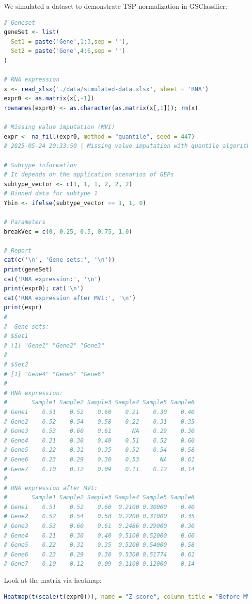 \documentclass[
  12pt,
]{book}
\begin{document}
We simulated a dataset to demonstrate TSP normalization in GSClassifier:

\begin{lstlisting}[language=R]
# Geneset
geneSet <- list(
  Set1 = paste('Gene',1:3,sep = ''),
  Set2 = paste('Gene',4:6,sep = '')
)

# RNA expression
x <- read_xlsx('./data/simulated-data.xlsx', sheet = 'RNA')
expr0 <- as.matrix(x[,-1])
rownames(expr0) <- as.character(as.matrix(x[,1])); rm(x)

# Missing value imputation (MVI)
expr <- na_fill(expr0, method = "quantile", seed = 447)
# 2025-05-24 20:33:50 | Missing value imputation with quantile algorithm!

# Subtype information
# It depends on the application scenarios of GEPs
subtype_vector <- c(1, 1, 1, 2, 2, 2)
# Binned data for subtype 1
Ybin <- ifelse(subtype_vector == 1, 1, 0)

# Parameters
breakVec = c(0, 0.25, 0.5, 0.75, 1.0)

# Report
cat(c('\n', 'Gene sets:', '\n'))
print(geneSet)
cat('RNA expression:', '\n')
print(expr0); cat('\n')
cat('RNA expression after MVI:', '\n')
print(expr)
# 
#  Gene sets: 
# $Set1
# [1] "Gene1" "Gene2" "Gene3"
# 
# $Set2
# [1] "Gene4" "Gene5" "Gene6"
# 
# RNA expression: 
#       Sample1 Sample2 Sample3 Sample4 Sample5 Sample6
# Gene1    0.51    0.52    0.60    0.21    0.30    0.40
# Gene2    0.52    0.54    0.58    0.22    0.31    0.35
# Gene3    0.53    0.60    0.61      NA    0.29    0.30
# Gene4    0.21    0.30    0.40    0.51    0.52    0.60
# Gene5    0.22    0.31    0.35    0.52    0.54    0.58
# Gene6    0.23    0.29    0.30    0.53      NA    0.61
# Gene7    0.10    0.12    0.09    0.11    0.12    0.14
# 
# RNA expression after MVI: 
#       Sample1 Sample2 Sample3 Sample4 Sample5 Sample6
# Gene1    0.51    0.52    0.60  0.2100 0.30000    0.40
# Gene2    0.52    0.54    0.58  0.2200 0.31000    0.35
# Gene3    0.53    0.60    0.61  0.2486 0.29000    0.30
# Gene4    0.21    0.30    0.40  0.5100 0.52000    0.60
# Gene5    0.22    0.31    0.35  0.5200 0.54000    0.58
# Gene6    0.23    0.29    0.30  0.5300 0.51774    0.61
# Gene7    0.10    0.12    0.09  0.1100 0.12000    0.14
\end{lstlisting}

Look at the matrix via heatmap:

\begin{lstlisting}[language=R]
Heatmap(t(scale(t(expr0))), name = "Z-score", column_title = "Before MVI")
\end{lstlisting}
\end{document}
